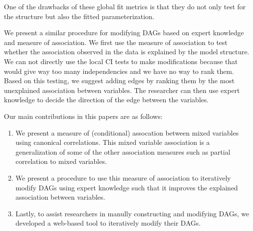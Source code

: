 \documentclass[letterpaper]{article} %
\begin{document}

One of the drawbacks of these global fit metrics is that they do not only test
for the structure but also the fitted parameterization.

We present a similar procedure for modifying DAGs based on expert knowledge and
measure of association. We first use the measure of association to test whether
the association observed in the data is explained by the model structure. We
can not directly use the local CI tests to make modifications because that
would give way too many independencies and we have no way to rank them. Based
on this testing, we suggest adding edges by ranking them by the most
unexplained association between variables. The researcher can then use expert
knowledge to decide the direction of the edge between the variables.

Our main contributions in this papers are as follows:
\begin{enumerate}
	\item We present a measure of (conditional) assocation between mixed variables using
		canonical correlations. This mixed variable association is a generalization 
		of some of the other association measures such as partial correlation to 
		mixed variables.
	\item We present a procedure to use this measure of association to
		iteratively modify DAGs using expert knowledge such that it
		improves the explained association between variables.
	\item Lastly, to assist researchers in manully constructing and modifying DAGs,
		we developed a web-based tool to iteratively modify their DAGs.
\end{enumerate}
\end{document}
